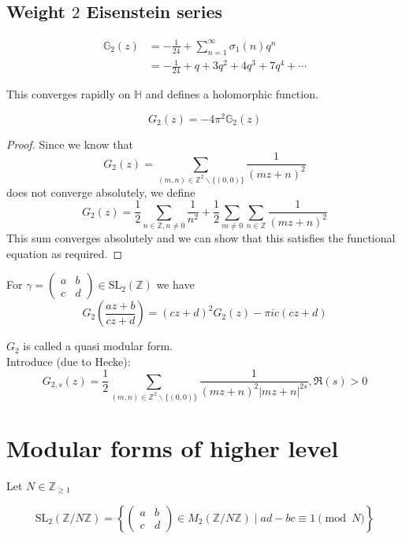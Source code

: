 \documentclass[oneside, 12pt, ]{scrbook}
\newcommand{\ZZ}{\mathbb Z}
\theoremstyle{theorem}
\begin{document}
\subsection{Weight $2$ Eisenstein series}

\begin{definition}
\begin{align*}
\mathbb{G}_{2}(z) &= -\frac{1}{24} + \sum_{n=1}^{\infty} \sigma_{1}(n)q^n \\
&= -\frac{1}{24} + q + 3q^2 + 4q^3 + 7q^4 + \cdots 
\end{align*} 
\end{definition}

This converges rapidly on $\mathbb{H}$ and defines a holomorphic function. 

\begin{proposition}
$$G_{2}(z) = - 4 \pi^2 \mathbb{G}_{2}(z)$$
\end{proposition}

\begin{proof}
Since we know that $$G_{2}(z) = \sum_{(m,n) \in \ZZ^2 \backslash \{(0,0)\}}\frac{1}{(mz+n)^2}$$ does not converge absolutely, we define $$G_{2}(z) = \frac{1}{2} \sum_{n \in \ZZ , n \neq 0} \frac{1}{n^2} + \frac{1}{2} \sum_{m \neq 0} \sum_{n \in \ZZ} \frac{1}{(mz+n)^2}$$
This sum converges absolutely and we can show that this satisfies the functional equation as required.
\end{proof}

\begin{proposition}
For $\gamma = \begin{pmatrix}
a & b \\ c & d 
\end{pmatrix} \in \mathrm{SL}_{2}(\ZZ)$ we have $$G_{2}\left( \frac{az+b}{cz+d} \right) = (cz+d)^2 G_{2}(z) - \pi i c(cz+d)$$
\end{proposition}

$G_{2}$ is called a quasi modular form. \\

Introduce (due to Hecke): $$G_{2,s}(z) = \frac{1}{2} \sum_{(m,n)\in \ZZ^2 \backslash \{(0,0)\}} \frac{1}{(mz+n)^2 |mz+n|^{2s}} , \mathfrak{R}(s) >0$$

\section{Modular forms of higher level}

Let $N \in \ZZ_{\geq 1}$ 

$$\mathrm{SL}_{2}(\ZZ / N \ZZ) =\left\{ \begin{pmatrix}
a & b \\ c & d
\end{pmatrix} \in M_{2}(\ZZ / N \ZZ) \mid ad-bc \equiv 1 \pmod{N} \right\}$$
\end{document}
